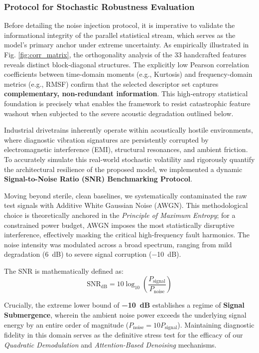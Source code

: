 \documentclass[5p,times,twocolumn]{elsarticle}
\begin{document}
\subsubsection{Protocol for Stochastic Robustness Evaluation}

Before detailing the noise injection protocol, it is imperative to validate the informational integrity of the parallel statistical stream, which serves as the model's primary anchor under extreme uncertainty. As empirically illustrated in Fig. \ref{fig:corr_matrix}, the orthogonality analysis of the 33 handcrafted features reveals distinct block-diagonal structures. The explicitly low Pearson correlation coefficients between time-domain moments (e.g., Kurtosis) and frequency-domain metrics (e.g., RMSF) confirm that the selected descriptor set captures \textbf{complementary, non-redundant information}. This high-entropy statistical foundation is precisely what enables the framework to resist catastrophic feature washout when subjected to the severe acoustic degradation outlined below.

Industrial drivetrains inherently operate within acoustically hostile environments, where diagnostic vibration signatures are persistently corrupted by electromagnetic interference (EMI), structural resonances, and ambient friction. To accurately simulate this real-world stochastic volatility and rigorously quantify the architectural resilience of the proposed model, we implemented a dynamic \textbf{Signal-to-Noise Ratio (SNR) Benchmarking Protocol}.

Moving beyond sterile, clean baselines, we systematically contaminated the raw test signals with Additive White Gaussian Noise (AWGN). This methodological choice is theoretically anchored in the \textit{Principle of Maximum Entropy}; for a constrained power budget, AWGN imposes the most statistically disruptive interference, effectively masking the critical high-frequency fault harmonics. The noise intensity was modulated across a broad spectrum, ranging from mild degradation (\SI{+6}{dB}) to severe signal corruption (\SI{-10}{dB}).

The SNR is mathematically defined as:
\begin{equation}
    \text{SNR}_{\text{dB}} = 10 \log_{10}\left(\frac{P_{\text{signal}}}{P_{\text{noise}}}\right)
\end{equation}

Crucially, the extreme lower bound of \textbf{\SI{-10}{dB}} establishes a regime of \textbf{Signal Submergence}, wherein the ambient noise power exceeds the underlying signal energy by an entire order of magnitude ($P_{\text{noise}} = 10 P_{\text{signal}}$). Maintaining diagnostic fidelity in this domain serves as the definitive stress test for the efficacy of our \textit{Quadratic Demodulation} and \textit{Attention-Based Denoising} mechanisms.
\end{document}
